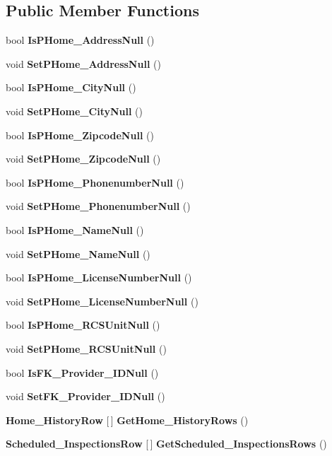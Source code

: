 \subsection*{Public Member Functions}
\begin{DoxyCompactItemize}
\item 
bool \textbf{ Is\+P\+Home\+\_\+\+Address\+Null} ()
\item 
void \textbf{ Set\+P\+Home\+\_\+\+Address\+Null} ()
\item 
bool \textbf{ Is\+P\+Home\+\_\+\+City\+Null} ()
\item 
void \textbf{ Set\+P\+Home\+\_\+\+City\+Null} ()
\item 
bool \textbf{ Is\+P\+Home\+\_\+\+Zipcode\+Null} ()
\item 
void \textbf{ Set\+P\+Home\+\_\+\+Zipcode\+Null} ()
\item 
bool \textbf{ Is\+P\+Home\+\_\+\+Phonenumber\+Null} ()
\item 
void \textbf{ Set\+P\+Home\+\_\+\+Phonenumber\+Null} ()
\item 
bool \textbf{ Is\+P\+Home\+\_\+\+Name\+Null} ()
\item 
void \textbf{ Set\+P\+Home\+\_\+\+Name\+Null} ()
\item 
bool \textbf{ Is\+P\+Home\+\_\+\+License\+Number\+Null} ()
\item 
void \textbf{ Set\+P\+Home\+\_\+\+License\+Number\+Null} ()
\item 
bool \textbf{ Is\+P\+Home\+\_\+\+R\+C\+S\+Unit\+Null} ()
\item 
void \textbf{ Set\+P\+Home\+\_\+\+R\+C\+S\+Unit\+Null} ()
\item 
bool \textbf{ Is\+F\+K\+\_\+\+Provider\+\_\+\+I\+D\+Null} ()
\item 
void \textbf{ Set\+F\+K\+\_\+\+Provider\+\_\+\+I\+D\+Null} ()
\item 
\textbf{ Home\+\_\+\+History\+Row} [$\,$] \textbf{ Get\+Home\+\_\+\+History\+Rows} ()
\item 
\textbf{ Scheduled\+\_\+\+Inspections\+Row} [$\,$] \textbf{ Get\+Scheduled\+\_\+\+Inspections\+Rows} ()
\end{DoxyCompactItemize}
